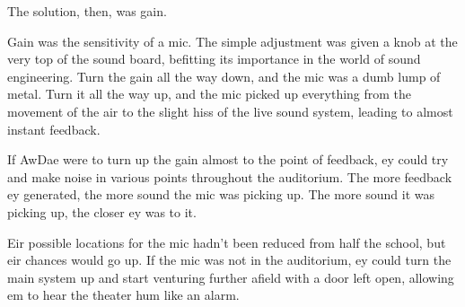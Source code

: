The solution, then, was gain.

Gain was the sensitivity of a mic. The simple adjustment was given a knob at the very top of the sound board, befitting its importance in the world of sound engineering. Turn the gain all the way down, and the mic was a dumb lump of metal. Turn it all the way up, and the mic picked up everything from the movement of the air to the slight hiss of the live sound system, leading to almost instant feedback.

If AwDae were to turn up the gain almost to the point of feedback, ey could try and make noise in various points throughout the auditorium. The more feedback ey generated, the more sound the mic was picking up. The more sound it was picking up, the closer ey was to it.

Eir possible locations for the mic hadn't been reduced from half the school, but eir chances would go up. If the mic was not in the auditorium, ey could turn the main system up and start venturing further afield with a door left open, allowing em to hear the theater hum like an alarm.
